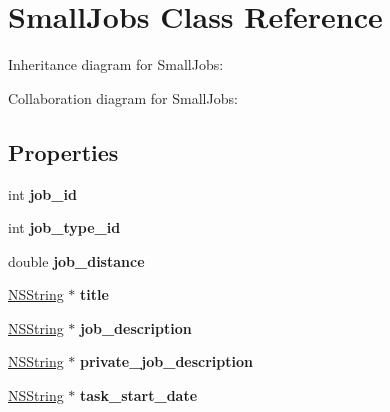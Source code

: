 \hypertarget{interface_small_jobs}{
\section{\-Small\-Jobs \-Class \-Reference}
\label{interface_small_jobs}
}


\-Inheritance diagram for \-Small\-Jobs\-:


\-Collaboration diagram for \-Small\-Jobs\-:
\subsection*{\-Properties}
\begin{DoxyCompactItemize}
\item 
\hypertarget{interface_small_jobs_a890361b98536bb5ca3a1f822789c54ae}{
int {\bfseries job\-\_\-id}}
\label{interface_small_jobs_a890361b98536bb5ca3a1f822789c54ae}

\item 
\hypertarget{interface_small_jobs_a049c65ac961ebe11e0e009c4c63e14cd}{
int {\bfseries job\-\_\-type\-\_\-id}}
\label{interface_small_jobs_a049c65ac961ebe11e0e009c4c63e14cd}

\item 
\hypertarget{interface_small_jobs_af7881081329b088e02562bab2dcbcc0c}{
double {\bfseries job\-\_\-distance}}
\label{interface_small_jobs_af7881081329b088e02562bab2dcbcc0c}

\item 
\hypertarget{interface_small_jobs_a2e070de6fe042ec9ffc097debab3814b}{
\hyperlink{class_n_s_string}{\-N\-S\-String} $\ast$ {\bfseries title}}
\label{interface_small_jobs_a2e070de6fe042ec9ffc097debab3814b}

\item 
\hypertarget{interface_small_jobs_ad9a7ca6672f168afc4a92be5b9f6420f}{
\hyperlink{class_n_s_string}{\-N\-S\-String} $\ast$ {\bfseries job\-\_\-description}}
\label{interface_small_jobs_ad9a7ca6672f168afc4a92be5b9f6420f}

\item 
\hypertarget{interface_small_jobs_a892fad9b8b9cded10460026cd0b1662b}{
\hyperlink{class_n_s_string}{\-N\-S\-String} $\ast$ {\bfseries private\-\_\-job\-\_\-description}}
\label{interface_small_jobs_a892fad9b8b9cded10460026cd0b1662b}

\item 
\hypertarget{interface_small_jobs_a4f9c09d531ea8545b527a518d52507bd}{
\hyperlink{class_n_s_string}{\-N\-S\-String} $\ast$ {\bfseries task\-\_\-start\-\_\-date}}
\label{interface_small_jobs_a4f9c09d531ea8545b527a518d52507bd}


\end{DoxyCompactItemize}
